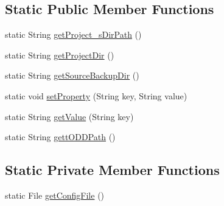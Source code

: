 \subsection*{Static Public Member Functions}
\begin{DoxyCompactItemize}
\item 
static String \hyperlink{classit_1_1isislab_1_1masonassisteddocumentation_1_1mason_1_1control_1_1_config_file_add444e913763f18b80005e5ad477c59d}{get\-Project\-\_\-s\-Dir\-Path} ()
\item 
static String \hyperlink{classit_1_1isislab_1_1masonassisteddocumentation_1_1mason_1_1control_1_1_config_file_a67bf373e54fb3ce5144d6f4fcbb48bfd}{get\-Project\-Dir} ()
\item 
static String \hyperlink{classit_1_1isislab_1_1masonassisteddocumentation_1_1mason_1_1control_1_1_config_file_a0bc9608fcc97bf301d3529c9ee9ae5f8}{get\-Source\-Backup\-Dir} ()
\item 
static void \hyperlink{classit_1_1isislab_1_1masonassisteddocumentation_1_1mason_1_1control_1_1_config_file_ae68816366df216e1d9525047c91e77fc}{set\-Property} (String key, String value)
\item 
static String \hyperlink{classit_1_1isislab_1_1masonassisteddocumentation_1_1mason_1_1control_1_1_config_file_abb43073f42616e4349b2fcb4e964c648}{get\-Value} (String key)
\item 
static String \hyperlink{classit_1_1isislab_1_1masonassisteddocumentation_1_1mason_1_1control_1_1_config_file_a69e02ec967d2a3c44d590d146036d816}{gett\-O\-D\-D\-Path} ()
\end{DoxyCompactItemize}
\subsection*{Static Private Member Functions}
\begin{DoxyCompactItemize}
\item 
static File \hyperlink{classit_1_1isislab_1_1masonassisteddocumentation_1_1mason_1_1control_1_1_config_file_af791ff01652e95f6385641909b805e20}{get\-Config\-File} ()
\end{DoxyCompactItemize}
